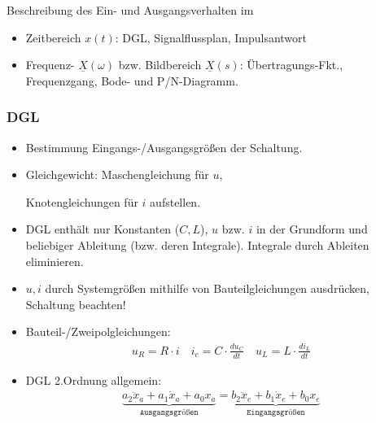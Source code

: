 Beschreibung des Ein- und Ausgangsverhalten im
\begin{itemize}
	\item Zeitbereich $x(t)$: DGL, Signalflussplan, Impulsantwort
	\item Frequenz- $\underline{X}(\omega)$ bzw. Bildbereich $\underline{X}(s)$: Übertragungs-Fkt., Frequenzgang, Bode- und P/N-Diagramm.
\end{itemize}
\subsubsection{DGL}
\begin{itemize}
	\small
	\item Bestimmung Eingangs-/Ausgangsgr\"o\ss en der Schaltung.
	\item Gleichgewicht: Maschengleichung für $u$,\par Knotengleichungen f\"ur $i$ aufstellen.
	\item DGL enth\"alt nur Konstanten ($C,L$), $u$ bzw. $i$ in der Grundform und beliebiger Ableitung (bzw. deren Integrale). Integrale durch Ableiten eliminieren.
	\item $u,i$ durch Systemgr\"o\ss en mithilfe von Bauteilgleichungen ausdr\"ucken, Schaltung beachten!
	\normalsize
	\item Bauteil-/Zweipolgleichungen:
	\begin{gather*}
		u_R = R \cdot i \quad \boxed{i_c = C \cdot \frac{du_C}{dt}} \quad \boxed{u_L = L \cdot \frac{di_L}{dt}}
	\end{gather*}
	\item DGL 2.Ordnung allgemein:
\begin{gather*}
		\underbrace{a_2 \ddot{x}_a + a_1 \dot{x}_a + a_0 x_a}_{\texttt{Ausgangsgr\"o\ss en}} = \underbrace{b_2 \ddot{x}_e + b_1 \dot{x}_e + b_0 x_e}_{\texttt{Eingangsgr\"o\ss en}}
\end{gather*}
\end{itemize}

